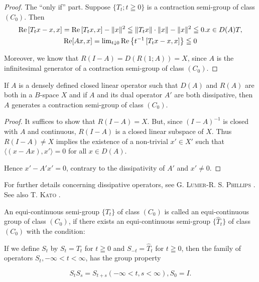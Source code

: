 \begin{proof}
The ``only if'' part. Suppose $\{T_{t}; t \geqq 0\}$ is a contraction semi-group of class $(C_{0})$. Then 
\begin{gather}\operatorname{Re} \left[ T _{t} x - x, x \right] = \operatorname{Re} \left[ T _{t} x, x \right] - \| x \| ^{2} \leqq \| T _{t} x \| \cdot \| x \| - \| x \| ^{2} \leqq 0. x \in D (A) T, \notag \\\operatorname{Re} [ A x, x ] = \lim\limits _{t \downarrow 0} \operatorname{Re} \left\{t ^{-1} \left[ T _{t} x - x, x \right] \right\} \leqq 0 \notag
\end{gather}

Moreover, we know that $R(I - A) = D(R(1; A)) = X$, since $A$ is the infinitesimal generator of a contraction semi-group of class $(C_0)$.
\end{proof}

\begin{corollaryu} If $A$ is a densely defined closed linear operator such that $D(A)$ and $R(A)$ are both in a $B$-space $X$ and if $A$ and its dual operator $A'$ are both dissipative, then $A$ generates a contraction semi-group of class $(C_{0})$. 
\end{corollaryu}

\begin{proof}
 It suffices to show that $R(I - A) = X$. But, since $(I - A)^{-1}$ is closed with $A$ and continuous, $R(I - A)$ is a closed linear subspace of $X$. Thus $R(I - A) \neq X$ implies the existence of a non-trivial $x' \in X'$ such that $\langle (x - Ax), x' \rangle = 0$ for all $x \in D(A)$. 

Hence $x' - A'x' = 0$, contrary to the dissipativity of $A'$ and $x' \neq 0$. 
\end{proof}

\begin{remarku} For further details concerning dissipative operators, see G. \textsc{Lumer}-R. S. \textsc{Phillips} \cite{lumer183}. See also T. \textsc{Kato} \cite{kato139}. 
\end{remarku}


\label{sec:IX.9}

\begin{definitionu} An equi-continuous semi-group $\{T_t\}$ of class $(C_0)$ is called an equi-continuous group of class $(C_0)$, if there exists an equi-continuous semi-group $\{\hat{T}_t\}$ of class $(C_0)$ with the condition: 

If we define $S_{t}$ by $S_{t} = T_{t}$ for $t \geqq 0$ and $S_{-t} = \hat{T}_{t}$ for $t \geqq 0$, then the family of operators $S_{t}, -\infty < t < \infty$, has the group property 
\end{definitionu}
\begin{equation}\label{eq:IX.9.1}
S _{t} S _{s} = S _{t+s} (- \infty < t, s < \infty), S _{0} = I.
\end{equation}

